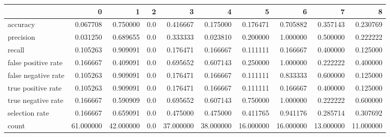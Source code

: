 \begin{tabular}{lrrrrrrrrr}
\toprule
{} &          0 &          1 &    2 &          3 &          4 &          5 &          6 &          7 &          8 \\
\midrule
accuracy            &   0.067708 &   0.750000 &  0.0 &   0.416667 &   0.175000 &   0.176471 &   0.705882 &   0.357143 &   0.230769 \\
precision           &   0.031250 &   0.689655 &  0.0 &   0.333333 &   0.023810 &   0.200000 &   1.000000 &   0.500000 &   0.222222 \\
recall              &   0.105263 &   0.909091 &  0.0 &   0.176471 &   0.166667 &   0.111111 &   0.166667 &   0.400000 &   0.125000 \\
false positive rate &   0.166667 &   0.409091 &  0.0 &   0.695652 &   0.607143 &   0.250000 &   1.000000 &   0.222222 &   0.400000 \\
false negative rate &   0.105263 &   0.909091 &  0.0 &   0.176471 &   0.166667 &   0.111111 &   0.833333 &   0.600000 &   0.125000 \\
true positive rate  &   0.105263 &   0.909091 &  0.0 &   0.176471 &   0.166667 &   0.111111 &   0.166667 &   0.400000 &   0.125000 \\
true negative rate  &   0.166667 &   0.590909 &  0.0 &   0.695652 &   0.607143 &   0.750000 &   1.000000 &   0.222222 &   0.600000 \\
selection rate      &   0.166667 &   0.659091 &  0.0 &   0.475000 &   0.475000 &   0.411765 &   0.941176 &   0.285714 &   0.307692 \\
count               &  61.000000 &  42.000000 &  0.0 &  37.000000 &  38.000000 &  16.000000 &  16.000000 &  13.000000 &  11.000000 \\
\bottomrule
\end{tabular}
